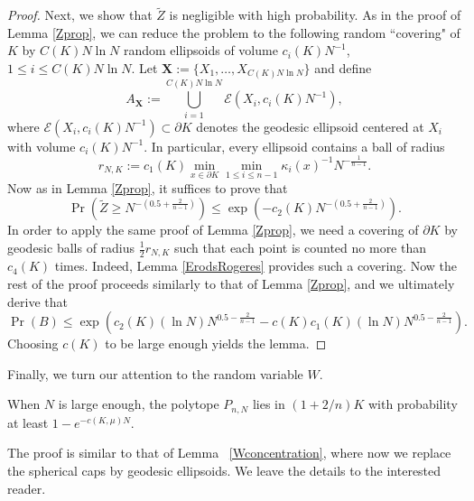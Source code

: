 \begin{proof}
	Next, we show that $ \tilde{Z} $ is negligible with high probability. As in the proof of Lemma \ref{Zprop}, we can reduce the problem to the following random ``covering" of $K$ by $C(K)N\ln N$ random ellipsoids of volume $c_i(K)N^{-1}$, $1\leq i\leq C(K)N\ln N$. Let $\mathbf{X} := \{X_1,\ldots, X_{C(K)N\ln N}\} $ and define 
	\[
	A_{\mathbf{X}} :=\bigcup_{i=1}^{C(K)N\ln N} \mathcal{E}(X_i,c_i(K)N^{-1}) ,
	\]
	where $ \mathcal{E}(X_i,c_i(K)N^{-1})  \subset \partial K$ denotes the geodesic ellipsoid centered at $X_i$ with volume $c_i(K)N^{-1}$.
	In particular, every ellipsoid contains a ball of radius 
	\[
	r_{N,K}:= c_1(K)\min_{x\in\partial K}\min_{1\leq i\leq n-1}\kappa_i(x)^{-1}N^{-\frac{1}{n-1}}.
	\]
	Now as in Lemma \ref{Zprop}, it suffices to prove that
	\[
	\Pr\left(\tilde Z \geq N^{-(0.5+\frac{2}{n-1})}\right) \leq \exp\left(-c_2(K)N^{-(0.5+\frac{2}{n-1})}\right) .
	\]
	In order to apply the same proof of Lemma \ref{Zprop},  we need  a covering of $\partial K$ by geodesic balls of radius $ \frac{1}{2}r_{N,K} $ such that each point is counted no more than $ c_4(K)  $ times. Indeed, Lemma \ref{ErodsRogeres} provides such a covering. Now the rest of the proof proceeds similarly to that of Lemma \ref{Zprop}, and we ultimately derive that
	\[
	\Pr(B) \leq  \exp\left(c_2(K)(\ln N)N^{0.5-\frac{2}{n-1}}-c(K)c_1(K)(\ln N)N^{0.5-\frac{2}{n-1}}\right).
	\]
	Choosing $c(K)$ to be large enough yields the lemma.
\end{proof}



Finally, we turn our attention to the random variable $W$. 

\begin{lemma}\label{WpropK}
	When $N$ is large enough, the polytope $P_{n,N}$ lies in $(1+2/n)K$ with probability at least $1-e^{-c(K,\mu)N}$.
\end{lemma}
The proof is similar to that of Lemma~ \ref{Wconcentration}, where now we replace the spherical caps by geodesic ellipsoids. We leave the details to the interested reader. 


